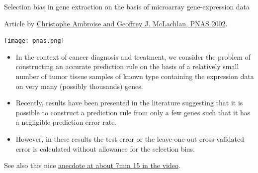 \documentclass[10pt,ignorenonframetext,]{beamer}
\begin{document}
\begin{frame}

\begin{block}{Selection bias in gene extraction on the basis of
microarray gene-expression data}

\vspace{2mm}

Article by \href{http://www.pnas.org/content/99/10/6562}{Christophe
Ambroise and Geoffrey J. McLachlan, PNAS 2002}.

\centering
\texttt{[image: pnas.png]}

\end{block}

\end{frame}

\begin{frame}

\begin{itemize}
\item
  In the context of cancer diagnosis and treatment, we consider the
  problem of constructing an accurate prediction rule on the basis of a
  relatively small number of tumor tissue samples of known type
  containing the expression data on very many (possibly thousands)
  genes.
\item
  Recently, results have been presented in the literature suggesting
  that it is possible to construct a prediction rule from only a few
  genes such that it has a negligible prediction error rate.
\item
  However, in these results the test error or the leave-one-out
  cross-validated error is calculated without allowance for the
  selection bias.
\end{itemize}

\vspace{2mm} See also this nice
\href{https://www.youtube.com/watch?v=S06JpVoNaA0}{anecdote at about
7min 15 in the video}.

\end{frame}
\end{document}
